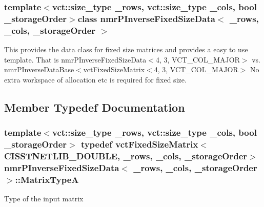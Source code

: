\subsubsection*{template$<$vct\+::size\+\_\+type \+\_\+rows, vct\+::size\+\_\+type \+\_\+cols, bool \+\_\+storage\+Order$>$class nmr\+P\+Inverse\+Fixed\+Size\+Data$<$ \+\_\+rows, \+\_\+cols, \+\_\+storage\+Order $>$}

This provides the data class for fixed size matrices and provides a easy to use template. That is nmr\+P\+Inverse\+Fixed\+Size\+Data$<$4, 3, V\+C\+T\+\_\+\+C\+O\+L\+\_\+\+M\+A\+J\+O\+R$>$ vs. nmr\+P\+Inverse\+Data\+Base$<$vct\+Fixed\+Size\+Matrix$<$4, 3, V\+C\+T\+\_\+\+C\+O\+L\+\_\+\+M\+A\+J\+O\+R$>$ No extra workspace of allocation etc is required for fixed size. 

\subsection{Member Typedef Documentation}
\hypertarget{classnmr_p_inverse_fixed_size_data_a3ea248e2be6732ed0138508f1dae09d6}{}
\subsubsection[{Matrix\+Type\+A}]{\setlength{\rightskip}{0pt plus 5cm}template$<$vct\+::size\+\_\+type \+\_\+rows, vct\+::size\+\_\+type \+\_\+cols, bool \+\_\+storage\+Order$>$ typedef {\bf vct\+Fixed\+Size\+Matrix}$<$C\+I\+S\+S\+T\+N\+E\+T\+L\+I\+B\+\_\+\+D\+O\+U\+B\+L\+E, \+\_\+rows, \+\_\+cols, \+\_\+storage\+Order$>$ {\bf nmr\+P\+Inverse\+Fixed\+Size\+Data}$<$ \+\_\+rows, \+\_\+cols, \+\_\+storage\+Order $>$\+::{\bf Matrix\+Type\+A}}\label{classnmr_p_inverse_fixed_size_data_a3ea248e2be6732ed0138508f1dae09d6}
Type of the input matrix \hypertarget{classnmr_p_inverse_fixed_size_data_abbeb86284eb856bc18f108e80906b04d}{}
